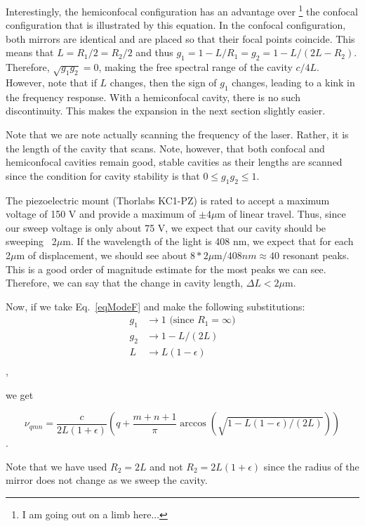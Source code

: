 Interestingly, the hemiconfocal configuration has an advantage over \footnote{I am going out on a limb here...} the confocal configuration that is illustrated by this equation. In the confocal configuration, both mirrors are identical and are placed so that their focal points coincide. This means that $L=R_1/2=R_2/2$ and thus $g_1=1-L/R_1=g_2=1-L/(2L-R_2)$. Therefore, $\sqrt{g_1g_2}=0$, making the free spectral range of the cavity $c/4L$. However, note that if $L$ changes, then the sign of $g_1$ changes, leading to a kink in the frequency response. With a hemiconfocal cavity, there is no such discontinuity. This makes the expansion in the next section slightly easier. 

Note that we are note actually scanning the frequency of the laser. Rather, it is the length of the cavity that scans. Note, however, that both confocal and hemiconfocal cavities remain good, stable cavities as their lengths are scanned since the condition for cavity stability is that $0\leq g_1 g_2 \leq 1$. 

The piezoelectric mount (Thorlabs KC1-PZ) is rated to accept a maximum voltage of 150 V and provide a maximum of $\pm4\mu$m of linear travel. Thus, since our sweep voltage is only about 75 V, we expect that our cavity should be sweeping ~2$\mu$m. If the wavelength of the light is 408 nm, we expect that for each 2$\mu$m of displacement, we should see about $8*2\mu$m$/408nm \approx 40$ resonant peaks. This is a good order of magnitude estimate for the most peaks we can see. Therefore, we can say that the change in cavity length, $\Delta L< 2\mu$m.

Now, if we take Eq.\ \ref{eqModeF} and make the following substitutions:
\begin{align}
g_1&\rightarrow1 \text{ (since $R_1=\infty$)} \\
g_2&\rightarrow 1-L/(2L)\\
L&\rightarrow L(1-\epsilon)\\
\end{align},

we get 

\begin{equation} \label{eqModeF_ready_for_expansion}
\nu_{qmn}=\frac{c}{2L(1+\epsilon)}\left(q+\frac{m+n+1}{\pi}\arccos(\sqrt{1-L(1-\epsilon)/(2L)})\right)
\end{equation}.

Note that we have used $R_2=2L$ and not $R_2=2L(1+\epsilon)$ since the radius of the mirror does not change as we sweep the cavity. 

